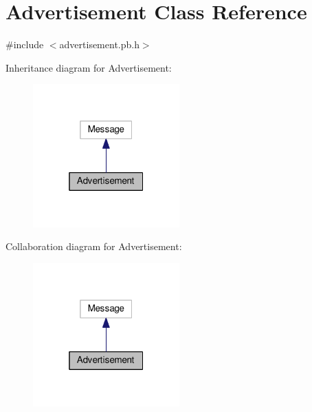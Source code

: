 \hypertarget{class_advertisement}{}\section{Advertisement Class Reference}
\label{class_advertisement}


{\ttfamily \#include $<$advertisement.\+pb.\+h$>$}



Inheritance diagram for Advertisement\+:\nopagebreak
\begin{figure}[H]
\begin{center}
\leavevmode
\includegraphics[width=160pt]{class_advertisement__inherit__graph}
\end{center}
\end{figure}


Collaboration diagram for Advertisement\+:\nopagebreak
\begin{figure}[H]
\begin{center}
\leavevmode
\includegraphics[width=160pt]{class_advertisement__coll__graph}
\end{center}
\end{figure}
